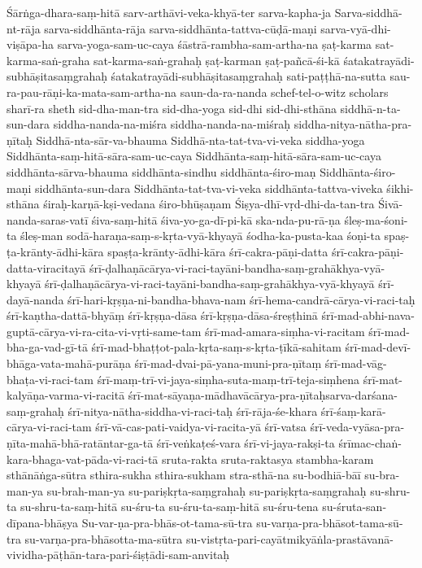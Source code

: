 {Śārṅga-dhara-saṃ-hitā
sarv-arthāvi-veka-khyā-ter
sarva-kapha-ja
Sarva-siddhā-nt-rāja
sarva-siddhānta-rāja
sarva-siddhānta-tattva-cūḍā-maṇi
sarva-vyā-dhi-viṣāpa-ha
sarva-yoga-sam-uc-caya
śāstrā-rambha-sam-artha-na
ṣaṭ-karma
sat-karma-saṅ-graha
sat-karma-saṅ-grahaḥ
ṣaṭ-karman
ṣaṭ-pañcā-śi-kā
śatakatrayādi-subhāṣitasaṃgrahaḥ
śatakatrayādi-subhāṣitasaṃgrahaḥ
sati-paṭṭhā-na-sutta
sau-ra-pau-rāṇi-ka-mata-sam-artha-na
saun-da-ra-nanda
schef-tel-o-witz
scholars
sharī-ra
sheth
sid-dha-man-tra
sid-dha-yoga
sid-dhi
sid-dhi-sthāna
siddhā-n-ta-sun-dara
siddha-nanda-na-miśra
siddha-nanda-na-miśraḥ
siddha-nitya-nātha-pra-ṇītaḥ
Siddhā-nta-sār-va-bhauma
Siddhā-nta-tat-tva-vi-veka
siddha-yoga
Siddhānta-saṃ-hitā-sāra-sam-uc-caya
Siddhānta-saṃ-hitā-sāra-sam-uc-caya
siddhānta-sārva-bhauma
siddhānta-sindhu
siddhānta-śiro-maṇ
Siddhānta-śiro-maṇi
siddhānta-sun-dara
Siddhānta-tat-tva-vi-veka
siddhānta-tattva-viveka
śikhi-sthāna
śiraḥ-karṇā-kṣi-vedana
śiro-bhūṣaṇam
Śiṣya-dhī-vṛd-dhi-da-tan-tra
Śivā-nanda-saras-vatī
śiva-saṃ-hitā
śiva-yo-ga-dī-pi-kā
ska-nda-pu-rā-ṇa
śleṣ-ma-śoni-ta
śleṣ-man
sodā-haraṇa-saṃ-s-kṛta-vyā-khyayā
śodha-ka-pusta-kaa
śoṇi-ta
spaṣ-ṭa-krānty-ādhi-kāra
spaṣṭa-krānty-ādhi-kāra
śrī-cakra-pāṇi-datta
śrī-cakra-pāṇi-datta-viracitayā
śrī-ḍalhaṇācārya-vi-raci-tayāni-bandha-saṃ-grahākhya-vyā-khyayā
śrī-ḍalhaṇācārya-vi-raci-tayāni-bandha-saṃ-grahākhya-vyā-khyayā
śrī-dayā-nanda
śrī-hari-kṛṣṇa-ni-bandha-bhava-nam
śrī-hema-candrā-cārya-vi-raci-taḥ
śrī-kaṇtha-dattā-bhyāṃ
śrī-kṛṣṇa-dāsa
śrī-kṛṣṇa-dāsa-śreṣṭhinā
śrī-mad-abhi-nava-guptā-cārya-vi-ra-cita-vi-vṛti-same-tam
śrī-mad-amara-siṃha-vi-racitam
śrī-mad-bha-ga-vad-gī-tā
śrī-mad-bhaṭṭot-pala-kṛta-saṃ-s-kṛta-ṭīkā-sahitam
śrī-mad-devī-bhāga-vata-mahā-purāṇa
śrī-mad-dvai-pā-yana-muni-pra-ṇītaṃ
śrī-mad-vāg-bhaṭa-vi-raci-tam
śrī-maṃ-trī-vi-jaya-siṃha-suta-maṃ-trī-teja-siṃhena
śrī-mat-kalyāṇa-varma-vi-racitā
śrī-mat-sāyaṇa-mādhavācārya-pra-ṇītaḥsarva-darśana-saṃ-grahaḥ
śrī-nitya-nātha-siddha-vi-raci-taḥ
śrī-rāja-śe-khara
śrī-śaṃ-karā-cārya-vi-raci-tam
śrī-vā-cas-pati-vaidya-vi-racita-yā
śrī-vatsa
śrī-veda-vyāsa-pra-ṇīta-mahā-bhā-ratāntar-ga-tā
śrī-veṅkaṭeś-vara
śrī-vi-jaya-rakṣi-ta
śrīmac-chaṅ-kara-bhaga-vat-pāda-vi-raci-tā
sruta-rakta
sruta-raktasya
stambha-karam
sthānāṅga-sūtra
sthira-sukha
sthira-sukham
stra-sthā-na
su-bodhiā-bāī
su-bra-man-ya
su-brah-man-ya
su-pariṣkṛta-saṃgrahaḥ
su-pariṣkṛta-saṃgrahaḥ
su-shru-ta
su-shru-ta-saṃ-hitā
su-śru-ta
su-śru-ta-saṃ-hitā
su-śru-tena
su-śruta-san-dīpana-bhāṣya
Su-var-ṇa-pra-bhās-ot-tama-sū-tra
su-varṇa-pra-bhāsot-tama-sū-tra
su-varṇa-pra-bhāsotta-ma-sūtra
su-vistṛta-pari-cayātmikyāṅla-prastāvanā-vividha-pāṭhān-tara-pari-śiṣṭādi-sam-anvitaḥ
}
